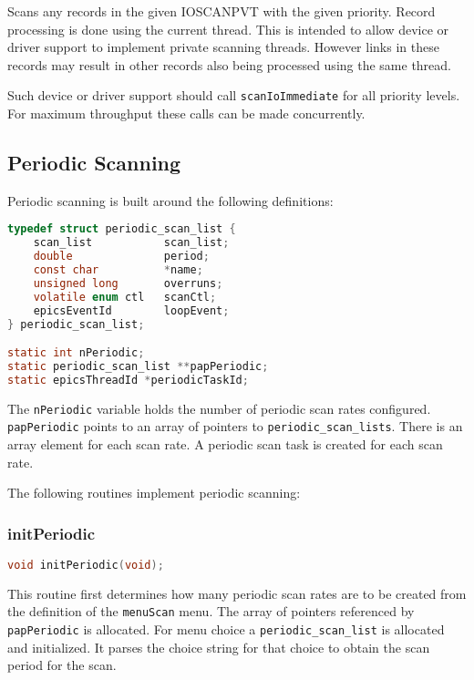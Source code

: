 Scans any records in the given IOSCANPVT with the given priority.
Record processing is done using the current thread.
This is intended to allow device or driver support to implement private scanning threads.
However links in these records may result in other records also being processed using the same thread.

Such device or driver support should call \verb|scanIoImmediate| for all priority levels.
For maximum throughput these calls can be made concurrently.

\subsection{Periodic Scanning}

Periodic scanning is built around the following definitions:

\begin{lstlisting}[language=C]
typedef struct periodic_scan_list {
    scan_list           scan_list;
    double              period;
    const char          *name;
    unsigned long       overruns;
    volatile enum ctl   scanCtl;
    epicsEventId        loopEvent;
} periodic_scan_list;

static int nPeriodic;
static periodic_scan_list **papPeriodic;
static epicsThreadId *periodicTaskId;
\end{lstlisting}

The \verb|nPeriodic| variable holds the number of periodic scan rates configured.
\verb|papPeriodic| points to an array of pointers to \verb|periodic_scan_lists|.
There is an array element for each scan rate.
A periodic scan task is created for each scan rate.

The following routines implement periodic scanning:

\subsubsection{initPeriodic}

\begin{lstlisting}[language=C]
void initPeriodic(void);
\end{lstlisting}

This routine first determines how many periodic scan rates are to be created from the definition of the \verb|menuScan| menu.
The array of pointers referenced by \verb|papPeriodic| is allocated.
For menu choice a \verb|periodic_scan_list| is allocated and initialized.
It parses the choice string for that choice to obtain the scan period for the scan.

